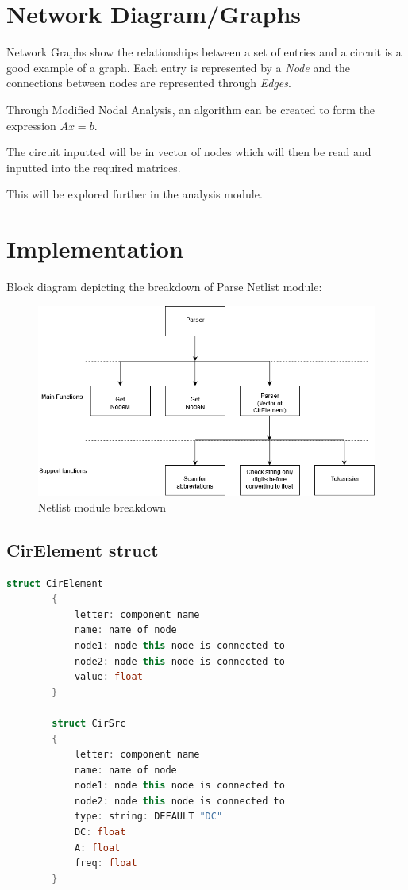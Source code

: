 \documentclass[a4paper, titlepage]{article}
\begin{document}
    \pagebreak
    \section{Network Diagram/Graphs}
    Network Graphs show the relationships between a set of entries and a circuit is a good example of a graph.
    Each entry is represented by a \textit{Node} and the connections between nodes are represented through \textit{Edges}.
    \par
    Through Modified Nodal Analysis, an algorithm can be created to form the expression $Ax = b$.
    \par
    The circuit inputted will be in vector of nodes which will then be read and inputted into the required matrices.

    \par
    This will be explored further in the analysis module.
    \pagebreak

    \section{Implementation}
    Block diagram depicting the breakdown of Parse Netlist module:
    \begin{center}
        \begin{figure}[h]
        \includegraphics[width=\linewidth]{Netlist breakdown}
        \caption{Netlist module breakdown}
        \label{fig:Netlist breakdown}
        \end{figure}
    \end{center}
    
    \subsection{CirElement struct}
    \begin{lstlisting}[language=C++]
        struct CirElement 
        {
            letter: component name
            name: name of node
            node1: node this node is connected to 
            node2: node this node is connected to
            value: float
        }

        struct CirSrc
        {
            letter: component name
            name: name of node
            node1: node this node is connected to 
            node2: node this node is connected to
            type: string: DEFAULT "DC"
            DC: float
            A: float
            freq: float
        }
    \end{lstlisting}
\end{document}

